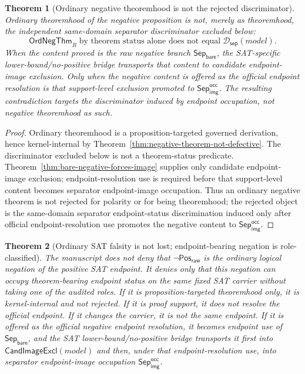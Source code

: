 \documentclass[11pt]{article}
\newtheorem{theorem}{Theorem}[section]
\theoremstyle{definition}
\theoremstyle{remark}
\newcommand{\PosRaw}{\mathsf{Pos}_{\mathsf{raw}}}
\newcommand{\SepBare}{\mathsf{Sep}_{\mathsf{bare}}}
\newcommand{\SepImgOcc}{\mathsf{Sep}_{\mathsf{img}}^{\mathsf{occ}}}
\newcommand{\NegThm}{\mathsf{OrdNegThm}}
\newcommand{\SepDisc}{\mathcal{D}_{\mathsf{sep}}}
\newcommand{\CandImageExcl}{\mathsf{CandImageExcl}}
\begin{document}
\begin{theorem}[Ordinary negative theoremhood is not the rejected discriminator]\label{thm:ordinary-negative-not-discriminator}
Ordinary theoremhood of the negative proposition is not, merely as theoremhood, the independent same-domain separator discriminator excluded below:
\[
  \NegThm_R \;\text{by theorem status alone does not equal}\; \SepDisc(model).
\]
When the content proved is the raw negative branch \(\SepBare\), the SAT-specific lower-bound/no-positive bridge transports that content to candidate endpoint-image exclusion. Only when the negative content is offered as the official endpoint resolution is that support-level exclusion promoted to \(\SepImgOcc\). The resulting contradiction targets the discriminator induced by endpoint occupation, not negative theoremhood as such.
\end{theorem}

\begin{proof}
Ordinary theoremhood is a proposition-targeted governed derivation, hence kernel-internal by Theorem~\ref{thm:negative-theorem-not-defective}. The discriminator excluded below is not a theorem-status predicate. Theorem~\ref{thm:bare-negative-forces-image} supplies only candidate endpoint-image exclusion; endpoint-resolution use is required before that support-level content becomes separator endpoint-image occupation. Thus an ordinary negative theorem is not rejected for polarity or for being theoremhood; the rejected object is the same-domain separator endpoint-status discrimination induced only after official endpoint-resolution use promotes the negative content to \(\SepImgOcc\).
\end{proof}



\begin{theorem}[Ordinary SAT falsity is not lost; endpoint-bearing negation is role-classified]\label{thm:ordinary-sat-falsity-role-classified}
The manuscript does not deny that \(\neg\PosRaw\) is the ordinary logical negation of the positive SAT endpoint. It denies only that this negation can occupy theorem-bearing endpoint status on the same fixed SAT carrier without taking one of the audited roles. If it is proposition-targeted theoremhood only, it is kernel-internal and not rejected. If it is proof support, it does not resolve the official endpoint. If it changes the carrier, it is not the same endpoint. If it is offered as the official negative endpoint resolution, it becomes endpoint use of \(\SepBare\), and the SAT lower-bound/no-positive bridge transports it first into \(\CandImageExcl(model)\) and then, under that endpoint-resolution use, into separator endpoint-image occupation \(\SepImgOcc\).
\end{theorem}
\end{document}
